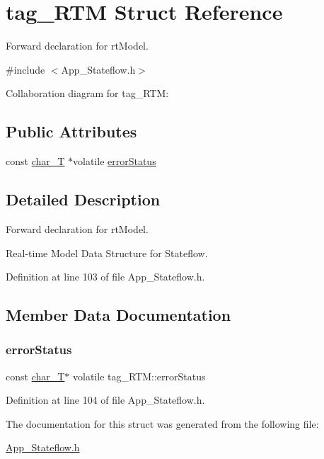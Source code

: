 \hypertarget{structtag___r_t_m}{}\section{tag\+\_\+\+R\+TM Struct Reference}
\label{structtag___r_t_m}


Forward declaration for rt\+Model.  




{\ttfamily \#include $<$App\+\_\+\+Stateflow.\+h$>$}



Collaboration diagram for tag\+\_\+\+R\+TM\+:
\subsection*{Public Attributes}
\begin{DoxyCompactItemize}
\item 
const \mbox{\hyperlink{_app___stateflowtypes_8h_a0fd897430c65dad7d2638a12bc4ea8b5}{char\+\_\+T}} $\ast$volatile \mbox{\hyperlink{structtag___r_t_m_ad977c2bc0327f9acb30208f4dc6acffe}{error\+Status}}
\end{DoxyCompactItemize}


\subsection{Detailed Description}
Forward declaration for rt\+Model. 

Real-\/time Model Data Structure for Stateflow. 

Definition at line 103 of file App\+\_\+\+Stateflow.\+h.



\subsection{Member Data Documentation}
\mbox{\label{structtag___r_t_m_ad977c2bc0327f9acb30208f4dc6acffe}} 
\subsubsection{\texorpdfstring{errorStatus}{errorStatus}}
{\footnotesize\ttfamily const \mbox{\hyperlink{_app___stateflowtypes_8h_a0fd897430c65dad7d2638a12bc4ea8b5}{char\+\_\+T}}$\ast$ volatile tag\+\_\+\+R\+T\+M\+::error\+Status}



Definition at line 104 of file App\+\_\+\+Stateflow.\+h.



The documentation for this struct was generated from the following file\+:\begin{DoxyCompactItemize}
\item 
\mbox{\hyperlink{_app___stateflow_8h}{App\+\_\+\+Stateflow.\+h}}\end{DoxyCompactItemize}
